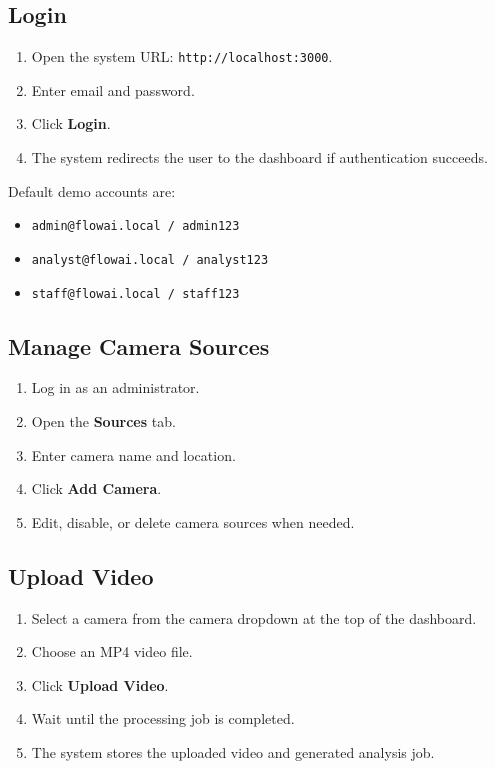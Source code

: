 \documentclass[12pt,a4paper]{report}
\begin{document}
\subsection{Login}

\begin{enumerate}
    \item Open the system URL: \texttt{http://localhost:3000}.
    \item Enter email and password.
    \item Click \textbf{Login}.
    \item The system redirects the user to the dashboard if authentication succeeds.
\end{enumerate}

Default demo accounts are:

\begin{itemize}
    \item \texttt{admin@flowai.local / admin123}
    \item \texttt{analyst@flowai.local / analyst123}
    \item \texttt{staff@flowai.local / staff123}
\end{itemize}

\subsection{Manage Camera Sources}

\begin{enumerate}
    \item Log in as an administrator.
    \item Open the \textbf{Sources} tab.
    \item Enter camera name and location.
    \item Click \textbf{Add Camera}.
    \item Edit, disable, or delete camera sources when needed.
\end{enumerate}

\subsection{Upload Video}

\begin{enumerate}
    \item Select a camera from the camera dropdown at the top of the dashboard.
    \item Choose an MP4 video file.
    \item Click \textbf{Upload Video}.
    \item Wait until the processing job is completed.
    \item The system stores the uploaded video and generated analysis job.
\end{enumerate}
\end{document}
